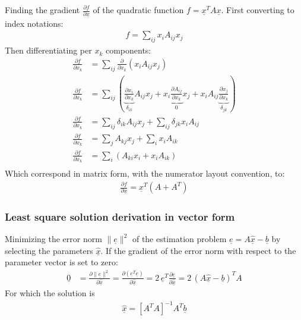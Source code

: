 Finding the gradient $\frac{\partial f}{\partial \underline{x}}$ of the quadratic function $f=\underline{x}^T A \underline{x}$. First converting to index notations:
\begin{align}
f = \sum_{ij}{x_i A_{ij} x_j}
\end{align}
Then differentiating per $x_k$ components:
\begin{align}
\frac{\partial f}{\partial x_k} &= \sum_{ij}{  \frac{\partial}{\partial x_k} \left(x_i A_{ij} x_j \right)} \\
\frac{\partial f}{\partial x_k} &= \sum_{ij}{\left( \underbrace{ \frac{\partial x_i}{\partial x_k}}_{\delta_{ik}}  A_{ij} x_j + x_i \underbrace{\frac{\partial A_{ij} }{\partial x_k}}_{0} x_j + x_i A_{ij} \underbrace{\frac{\partial x_j}{\partial x_k}}_{\delta_{jk}} \right)} \\
\frac{\partial f}{\partial x_k} &= \sum_{ij}{  \delta_{ik}  A_{ij} x_j } + \sum_{ij}{  \delta_{jk} x_i A_{ij} }\\
\frac{\partial f}{\partial x_k} &= \sum_{j}{  A_{kj} x_j } + \sum_{i}{ x_i A_{ik} }\\
\frac{\partial f}{\partial x_k} &= \sum_{i}{\left(  A_{ki} x_i  + x_i A_{ik} \right)}\\
\end{align}
Which correspond in matrix form, with the numerator layout convention, to:
\begin{align}
\frac{\partial f}{\partial \underline{x}} = \underline{x}^T ( A + A^T )
\end{align}

\subsubsection{Least square solution derivation in vector form}

Minimizing the error norm $\|\underline{e}\|^2$ of the estimation problem $\underline{e} = A \underline{\hat{x}} - \underline{b}$ by selecting the parameters $\underline{\hat{x}}$. If the gradient of the error norm with respect to the parameter vector is set to zero:
\begin{align}
\underline{0} &= \frac{\partial \|\underline{e}\|^2 }{\partial \underline{\hat{x}}} = \frac{\partial (\underline{e}^T \underline{e} )}{\partial \underline{\hat{x}}} = 2 \, \underline{e}^T \frac{\partial \underline{e} }{\partial \underline{\hat{x}}} = 2\, (A \underline{\hat{x}} - \underline{b})^T A 
\end{align}
For which the solution is
\begin{align}
\underline{\hat{x}} = \left[ A^T A \right]^{-1} A^T \underline{b}
\end{align}